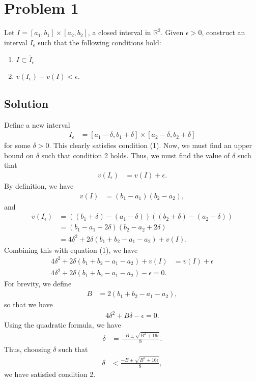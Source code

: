 \documentclass[10pt,a4paper]{article}
\author{Jeremiah Givens}
\theoremstyle{theorem}
\theoremstyle{definition}
\begin{document}
\section*{Problem 1}
Let $I = [a_1, b_1] \times [a_2, b_2]$, a closed interval in $\mathbb{R}^2$. Given $\epsilon >0$, construct an interval $I_\epsilon$ such that the following conditions hold:
\begin{enumerate}
\item $I \subset \mathring{I_\epsilon}$
\item $v(I_\epsilon) - v(I) < \epsilon$.
\end{enumerate}
\subsection*{Solution}
Define a new interval
\begin{align*}
I_\epsilon &= [a_1 - \delta, b_1 + \delta] \times [a_2 - \delta, b_2 + \delta]
\end{align*}
for some $\delta > 0$. This clearly satisfies condition (1). Now, we must find an upper bound on $\delta$ such that condition 2 holds. Thus, we must find the value of $\delta$ such that 
\begin{align}
v(I_\epsilon) &= v(I) + \epsilon.
\end{align}
By definition, we have
\begin{align*}
v(I) &= (b_1 - a_1)(b_2 - a_2),
\end{align*}
and 
\begin{align*}
v(I_\epsilon)&= ((b_1 + \delta) - (a_1 - \delta))((b_2 + \delta) - (a_2 - \delta))\\
&= (b_1 - a_1 + 2 \delta)(b_2 - a_2 + 2 \delta)\\
&= 4 \delta^2 + 2\delta(b_1 + b_2 - a_1 - a_2) + v(I).
\end{align*}
Combining this with equation (1), we have
\begin{align*}
4 \delta^2 + 2\delta(b_1 + b_2 - a_1 - a_2) + v(I) &= v(I) + \epsilon\\
4 \delta^2 + 2\delta(b_1 + b_2 - a_1 - a_2) - \epsilon = 0.
\end{align*}
For brevity, we define
\begin{align*}
B &= 2(b_1 + b_2 - a_1 - a_2),
\end{align*}
so that we have
\begin{align*}
4 \delta^2 + B\delta - \epsilon = 0.
\end{align*}
Using the quadratic formula, we have
\begin{align*}
\delta &= \frac{-B \pm \sqrt{B^2 + 16 \epsilon}}{8}.
\end{align*}
Thus, choosing $\delta$ such that 
\begin{align*}
\delta &< \frac{-B \pm \sqrt{B^2 + 16 \epsilon}}{8},
\end{align*}
we have satisfied condition 2.
\end{document}
